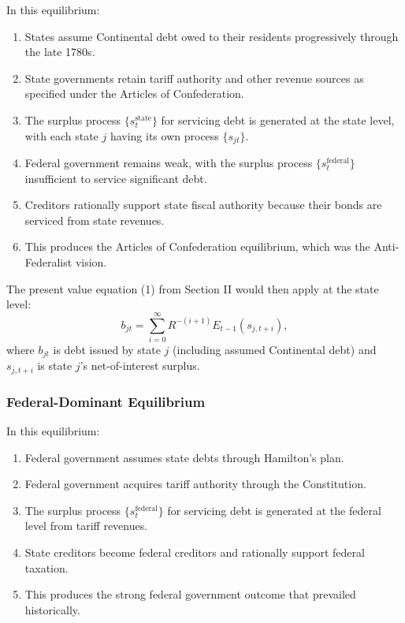 \documentclass[12pt]{article}
\begin{document}
In this equilibrium:
\begin{enumerate}
\item States assume Continental debt owed to their residents progressively through the late 1780s.
\item State governments retain tariff authority and other revenue sources as specified under the Articles of Confederation.
\item The surplus process $\{s_t^{\text{state}}\}$ for servicing debt is generated at the state level, with each state $j$ having its own process $\{s_{jt}\}$.
\item Federal government remains weak, with the surplus process $\{s_t^{\text{federal}}\}$ insufficient to service significant debt.
\item Creditors rationally support state fiscal authority because their bonds are serviced from state revenues.
\item This produces the Articles of Confederation equilibrium, which was the Anti-Federalist vision.
\end{enumerate}

The present value equation (1) from Section II would then apply at the state level:
\begin{equation}
b_{jt} = \sum_{i=0}^{\infty} R^{-(i+1)} E_{t-1}(s_{j,t+i}),
\end{equation}
where $b_{jt}$ is debt issued by state $j$ (including assumed Continental debt) and $s_{j,t+i}$ is state $j$'s net-of-interest surplus.

\subsubsection{Federal-Dominant Equilibrium}

In this equilibrium:
\begin{enumerate}
\item Federal government assumes state debts through Hamilton's plan.
\item Federal government acquires tariff authority through the Constitution.
\item The surplus process $\{s_t^{\text{federal}}\}$ for servicing debt is generated at the federal level from tariff revenues.
\item State creditors become federal creditors and rationally support federal taxation.
\item This produces the strong federal government outcome that prevailed historically.
\end{enumerate}
\end{document}
